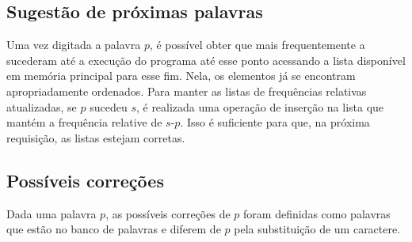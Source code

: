 \documentclass[12pt]{article}
\begin{document}
    \subsection{Sugestão de próximas palavras}
    Uma vez digitada a palavra $p$, é possível obter que mais frequentemente a sucederam até a execução do programa até esse ponto acessando a lista disponível em memória principal para esse fim.
    Nela, os elementos já se encontram apropriadamente ordenados.
    Para manter as listas de frequências relativas atualizadas, se $p$ sucedeu $s$, é realizada uma operação de inserção na lista que mantém a frequência relative de $s$-$p$.
    Isso é suficiente para que, na próxima requisição, as listas estejam corretas.

    \subsection{Possíveis correções}
    Dada uma palavra $p$, as possíveis correções de $p$ foram definidas como palavras que estão no banco de palavras e diferem de $p$ pela substituição de um caractere.
\end{document}
